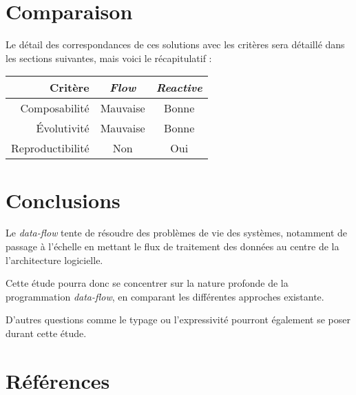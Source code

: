 \documentclass{article}
\begin{document}
\section{Comparaison}
Le détail des correspondances de ces solutions avec les critères sera détaillé
dans les sections suivantes, mais voici le récapitulatif :

\begin{center}
\begin{tabular}{r|c c}
Critère & \emph{Flow} & \emph{Reactive} \\
\hline
Composabilité & Mauvaise & Bonne \\
Évolutivité & Mauvaise & Bonne \\
Reproductibilité & Non & Oui \\
\end{tabular}
\end{center}

\section{Conclusions}\label{conclusions}

Le \emph{data-flow} tente de résoudre des problèmes de vie des systèmes,
notamment de passage à l'échelle en mettant le flux de traitement des données
au centre de la l'architecture logicielle.

Cette étude pourra donc se concentrer sur la nature profonde de la
programmation \emph{data-flow}, en comparant les différentes approches
existante.

D'autres questions comme le typage ou l'expressivité pourront également
se poser durant cette étude.


\section{Références}\label{références}


\end{document}
